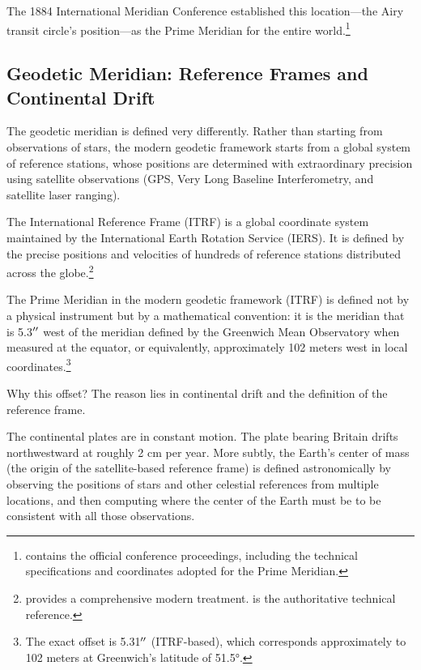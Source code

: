 The 1884 International Meridian Conference established this location---the Airy transit circle's position---as the Prime Meridian for the entire world.\footnote{\textcite{InternationalMeridianConference1884} contains the official conference proceedings, including the technical specifications and coordinates adopted for the Prime Meridian.}

\subsection{Geodetic Meridian: Reference Frames and Continental Drift}

The geodetic meridian is defined very differently. Rather than starting from observations of stars, the modern geodetic framework starts from a global system of reference stations, whose positions are determined with extraordinary precision using satellite observations (\textsc{GPS}, Very Long Baseline Interferometry, and satellite laser ranging).

The International Reference Frame (\textsc{ITRF}) is a global coordinate system maintained by the International Earth Rotation Service (\textsc{IERS}). It is defined by the precise positions and velocities of hundreds of reference stations distributed across the globe.\footnote{\textcite{McCarthy2009} provides a comprehensive modern treatment. \textcite{IERSConventions2010} is the authoritative technical reference.}

The Prime Meridian in the modern geodetic framework (\textsc{ITRF}) is defined not by a physical instrument but by a mathematical convention: it is the meridian that is 5.3$^{\prime\prime}$ west of the meridian defined by the Greenwich Mean Observatory when measured at the equator, or equivalently, approximately 102 meters west in local coordinates.\footnote{The exact offset is 5.31$^{\prime\prime}$ (\textsc{ITRF}-based), which corresponds approximately to 102 meters at Greenwich's latitude of 51.5°.}

Why this offset? The reason lies in continental drift and the definition of the reference frame.

The continental plates are in constant motion. The plate bearing Britain drifts northwestward at roughly 2 cm per year. More subtly, the Earth's center of mass (the origin of the satellite-based reference frame) is defined astronomically by observing the positions of stars and other celestial references from multiple locations, and then computing where the center of the Earth must be to be consistent with all those observations.

